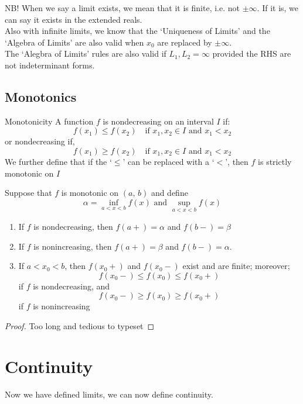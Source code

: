 \documentclass{article}
\renewcommand{\a}{\alpha}
\renewcommand{\b}{\beta}
\begin{document}
NB! When we say a limit exists, we mean that it is finite, i.e. not $\pm\infty$. If it is, we can say it exists in the extended reals.\\

Also with infinite limits, we know that the `Uniqueness of Limits' and the `Algebra of Limits' are also valid when $x_0$ are replaced by $\pm\infty$.\\

The `Alegbra of Limits' rules are also valid if $L_1,L_2 = \infty$ provided the RHS are not indeterminant forms.

\subsection{Monotonics}
\noindent\begin{definition}{Monotonicity}{}{
A function $f$ is {\color{blue} nondecreasing }on an interval $I$ if:
$$ f(x_1) \le f(x_2) \quad\text{if }x_1,x_2\in I \text{ and }x_1<x_2$$
or {\color{blue} nondecreasing }if,
$$ f(x_1) \ge f(x_2) \quad\text{if }x_1,x_2\in I \text{ and }x_1<x_2$$
We further define that if the `$\le$' can be replaced with a `$<$', then $f$ is strictly monotonic on $I$
}\end{definition}\vspace{10pt}

\begin{theorem}{}{}
  Suppose that $f$ is monotonic on $(a,\, b)$ and define
  $$ \a = \inf_{a<x<b}{f(x)} \text{ and } \sup_{a<x<b}{f(x)} $$
  \begin{enumerate}
    \item If $f$ is nondecreasing, then $f(a+)=\a$ and $f(b-)=\b$
    \item If $f$ is nonincreasing, then $f(a+)=\b$ and $f(b-)=\a$.
    \item If $a<x_0<b$, then $f(x_0+)$ and $f(x_0-)$ exist and are finite; moreover;
    $$ f(x_0-) \le f(x_0) \le f(x_0+) $$
    if $f$ is nondecreasing, and
    $$ f(x_0-)\ge f(x_0) \ge f(x_0+) $$
    if $f$ is nonincreasing
  \end{enumerate}
\end{theorem}
\begin{proof}
  Too long and tedious to typeset
\end{proof}

\newpage
\section{Continuity}
Now we have defined limits, we can now define continuity.\\
\end{document}
